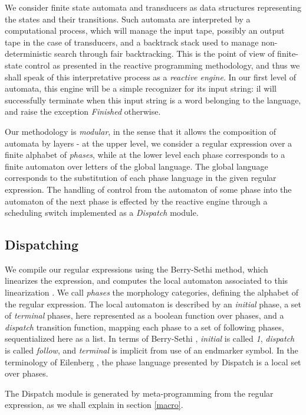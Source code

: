\documentclass[12pt]{article}
\begin{document}
We consider finite state automata and transducers as data structures representing the
states and their transitions. Such automata are interpreted by a computational process,
which will manage the input tape, possibly an output tape in the case of transducers,
and a backtrack stack used to manage non-deterministic search through fair backtracking. 
This is the point of view of finite-state control as presented in the reactive programming
methodology, and thus we shall speak of this interpretative process as a {\sl reactive engine}.
In our first level of automata, this engine will be a simple recognizer for its input string:
il will successfully terminate when this input string is a word belonging to the language,
and raise the exception {\sl Finished} otherwise.

Our methodology is {\sl modular}, in the sense that it allows the composition of automata
by layers - at the upper level, we consider a regular expression over a finite alphabet of 
{\sl phases}, while at the lower level each phase corresponds to a finite automaton over
letters of the global language. The global language corresponds to the substitution of
each phase language in the given regular expression. The handling of control from the automaton
of some phase into the automaton of the next phase is effected by the reactive engine through
a scheduling switch implemented as a {\sl Dispatch} module. 

\subsection{Dispatching}

We compile our regular expressions using the Berry-Sethi method, which
linearizes the expression, and computes the local automaton associated
to this linearization \cite{berrysethi,berstelpin}. We call {\em phases}
the morphology categories, defining the alphabet of the regular expression.
The local automaton is described by an {\sl initial} phase, 
a set of {\sl terminal} phases, here represented as
a boolean function over phases, and a {\sl dispatch} transition function,
mapping each phase to a set of following phases, sequentialized here as a list.
In terms of Berry-Sethi \cite{berrysethi}, {\sl initial} is called {\sl 1}, 
{\sl dispatch} is called {\sl follow}, and {\sl terminal} is implicit from
use of an endmarker symbol.
In the terminology of Eilenberg \cite{eilenberg}, the phase language
presented by Dispatch is a local set over phases. 

The Dispatch module is generated by meta-programming from the regular 
expression, as we shall explain in section \ref{macro}.
\end{document}
